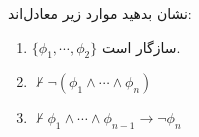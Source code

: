 نشان بدهید موارد زیر معادل‌اند:
\begin{enumerate}[label=(\alph*)]
    \item
    $\{\phi_1,\cdots,\phi_2\}$
    سازگار است.
    \item $\not\vdash\neg(\phi_1\wedge\cdots\wedge\phi_n)$
    \item $\not\vdash\phi_1\wedge\cdots\wedge\phi_{n-1}\to\neg\phi_n$
\end{enumerate}